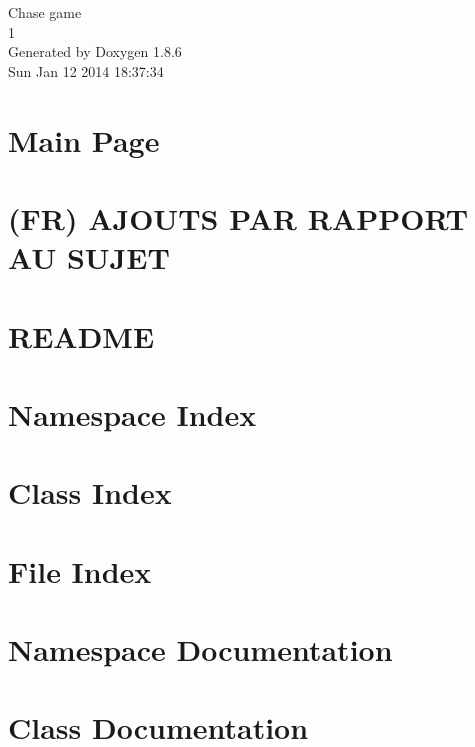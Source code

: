 \documentclass[twoside]{book}
\newcommand{\clearemptydoublepage}{%
  \newpage{\pagestyle{empty}\cleardoublepage}%
}
\begin{document}
\hypersetup{pageanchor=false}
\begin{titlepage}
\vspace*{7cm}
\begin{center}%
{\Large Chase game \\[1ex]\large 1 }\\
\vspace*{1cm}
{\large Generated by Doxygen 1.8.6}\\
\vspace*{0.5cm}
{\small Sun Jan 12 2014 18:37:34}\\
\end{center}
\end{titlepage}
\clearemptydoublepage
\tableofcontents
\clearemptydoublepage
{}
\hypersetup{pageanchor=true}

\chapter{Main Page}
\label{index}\hypertarget{index}{}
\chapter{(F\-R) A\-J\-O\-U\-T\-S P\-A\-R R\-A\-P\-P\-O\-R\-T A\-U S\-U\-J\-E\-T}
\label{md__c_h_a_n_g_e_s}
\hypertarget{md__c_h_a_n_g_e_s}{}

\chapter{R\-E\-A\-D\-M\-E}
\label{md__r_e_a_d_m_e}
\hypertarget{md__r_e_a_d_m_e}{}

\chapter{Namespace Index}

\chapter{Class Index}

\chapter{File Index}

\chapter{Namespace Documentation}

\chapter{Class Documentation}







\end{document}
